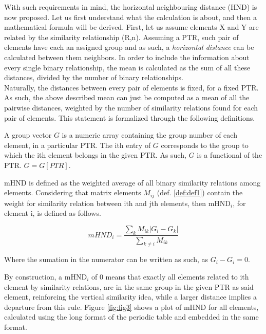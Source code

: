 \documentclass[article]{article}
\begin{document}
With such requirements in mind, the horizontal neighbouring distance (HND) is now proposed. Let us first understand what the calculation is about, and then a mathematical formula will be derived. First, let us assume elements X and Y are related by the similarity relationship (R,n). Assuming a PTR, such pair of elements have each an assigned group and as such, a \textit{horizontal distance} can be calculated between them neighbors. In order to include the information about every single binary relationship, the mean is calculated as the sum of all these distances, divided by the number of binary relationships.\\

Naturally, the distances between every pair of elements is fixed, for a fixed PTR. As such, the above described mean can just be computed as a mean of all the pairwise distances, weighted by the number of similarity relations found for each pair of elements. This statement is formalized through the following definitions.

\begin{definition}
\label{def:def3}
A group vector $G$ is a numeric array containing the group number of each element, in a particular PTR. The ith entry of $G$ corresponds to the group to which the ith element belongs in the given PTR. As such, $G$ is a functional of the PTR. $G=G[PTR]$.
\end{definition}

\begin{definition}
\label{def:def4}
mHND is defined as the weighted average of all binary similarity relations among elements. Considering that matrix elements $M_{ij}$ (def. \ref{def:def1}) contain the weight for similarity relation between ith and jth elements, then mHND$_i$, for element i, is defined as follows.

	\begin{equation}
		mHND_{i} = \frac{\sum_k M_{ik} | G_i - G_k |}{\sum_{k \neq i} M_{ik}}
	\end{equation}
	
Where the sumation in the numerator can be written as such, as $G_i - G_i = 0$.
\end{definition}

By construction, a mHND$_i$ of 0 means that exactly all elements related to ith element by similarity relations, are in the same group in the given PTR as said element, reinforcing the vertical similarity idea, while a larger distance implies a departure from this rule. Figure \ref{fig:fig3} shows a plot of mHND for all elements, calculated using the long format of the periodic table and embedded in the same format.
\end{document}
